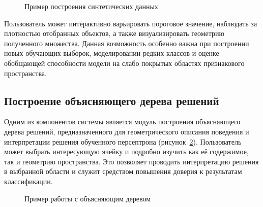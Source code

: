 \begin{figure}[ht]
    \caption{Пример построения синтетических данных}
    \label{fig:vis_synthetic_data}
\end{figure}

Пользователь может интерактивно варьировать пороговое значение, наблюдать за плотностью отобранных объектов, а также визуализировать геометрию полученного множества. Данная возможность особенно важна при построении новых обучающих выборок, моделировании редких классов и оценке обобщающей способности модели на слабо покрытых областях признакового пространства.

\subsection{Построение объясняющего дерева решений}
Одним из компонентов системы является модуль построения объясняющего дерева решений, предназначенного для геометрического описания поведения и интерпретации решения обученного персептрона (рисунок~\cref{fig:vis_extree}). Пользователь может выбрать интересующую ячейку и подробно изучить как её содержимое, так и геометрию пространства. Это позволяет проводить интерпретацию решения в выбранной области и служит средством повышения доверия к результатам классификации.

\begin{figure}[ht]
    \caption{Пример работы с объясняющим деревом}
    \label{fig:vis_extree}
\end{figure}
